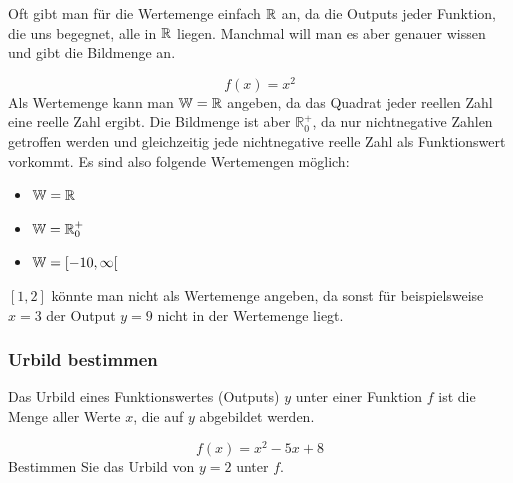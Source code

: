 Oft gibt man für die Wertemenge einfach $\operatorname{\mathbb{R}}$ an, da die Outputs jeder Funktion, die uns begegnet, alle in $\operatorname{\mathbb{R}}$ liegen. Manchmal will man es aber genauer wissen und gibt die Bildmenge an.
\begin{example}
    \[f(x) = x^2\]
    Als Wertemenge kann man $\operatorname{\mathbb{W}} = \operatorname{\mathbb{R}}$ angeben, da das Quadrat jeder reellen Zahl eine reelle Zahl ergibt. Die Bildmenge ist aber \(\mathbb{R}_0^+\), da nur nichtnegative Zahlen getroffen werden und gleichzeitig jede nichtnegative reelle Zahl als Funktionswert vorkommt. Es sind also folgende Wertemengen möglich:
    \begin{itemize}
        \item $\operatorname{\mathbb{W}} = \operatorname{\mathbb{R}}$
        \item $\operatorname{\mathbb{W}} = \operatorname{\mathbb{R}}_0^+$
        \item $\operatorname{\mathbb{W}} = [-10, \infty [$
    \end{itemize}
    $[1,2]$ könnte man nicht als Wertemenge angeben, da sonst für beispielsweise $x=3$ der Output $y=9$ nicht in der Wertemenge liegt.
\end{example}
\newpage
\subsubsection{Urbild bestimmen}
Das Urbild eines Funktionswertes (Outputs) $y$ unter einer Funktion $f$ ist die Menge aller Werte $x$, die auf $y$ abgebildet werden.
\begin{example}
    \[f(x) = x^2-5x + 8\]
    Bestimmen Sie das Urbild von $y=2$ unter $f$.

\end{example}
\newpage
